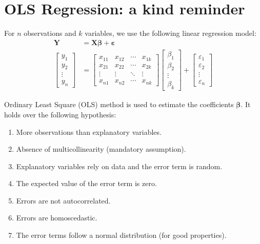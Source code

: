 \section{OLS Regression: a kind reminder}
For $n$ observations and $k$ variables, we use the following linear regression model:
\begin{align*}
    \boldsymbol{Y} & = \boldsymbol{X} \boldsymbol{\beta} + \boldsymbol{\varepsilon} \\
    \begin{bmatrix} 
        y_1 \\ y_2 \\ \vdots \\ y_n 
        \end{bmatrix} & = \begin{bmatrix}
        x_{11} & x_{12} & \cdots & x_{1k} \\ 
        x_{21} & x_{22} & \cdots & x_{2k} \\ 
        \vdots & \vdots & \ddots & \vdots \\ 
        x_{n1} & x_{n2} & \cdots & x_{nk} 
        \end{bmatrix} \begin{bmatrix}
        \beta_1 \\ \beta_2 \\ \vdots \\ \beta_k 
        \end{bmatrix} + \begin{bmatrix} 
        \varepsilon_1 \\ \varepsilon_2 \\ \vdots \\ \varepsilon_n \end{bmatrix}
\end{align*}

Ordinary Least Square (OLS) method is used to estimate the coefficients $\boldsymbol{\beta}$. It holds over the following hypothesis:
\begin{enumerate}
    \item More observations than explanatory variables.
    \item Absence of multicollinearity (mandatory assumption).
    \item Explanatory variables rely on data and the error term is random.
    \item The expected value of the error term is zero.
    \item Errors are not autocorrelated.
    \item Errors are homoscedastic.
    \item The error terms follow a normal distribution (for good properties).
\end{enumerate}

